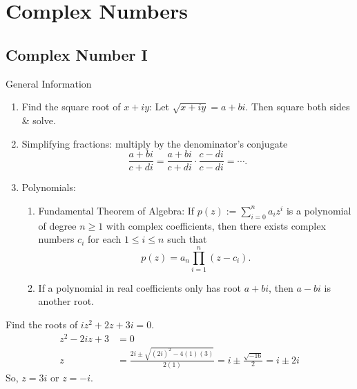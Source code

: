 \documentclass[oneside]{book}
\begin{document}
  \chapter{Complex Numbers}
  \section{Complex Number I}
  \begin{stbox}{General Information}
    \begin{enumerate}
      \item Find the square root of \(x+iy\): Let \(\sqrt{x+iy}=a+bi\). Then square both sides \& solve.
      \item Simplifying fractions: multiply by the denominator's conjugate
      \[\frac{a+bi}{c+di}=\frac{a+bi}{c+di}\cdot\frac{c-di}{c-di}=\cdots.\]
      \item Polynomials:
      \begin{enumerate}
        \item Fundamental Theorem of Algebra: If \(p(z):=\sum_{i=0}^{n}a_iz^i\) is a polynomial of degree \(n \geq 1\) with complex coefficients, then there exists complex numbers \(c_i\) for each \(1 \leq i \leq n\) such that 
        \[p(z)=a_n \prod_{i=1}^{n}(z-c_i).\]
        \item If a polynomial in real coefficients only has root \(a+bi\), then \(a-bi\) is another root.
      \end{enumerate}
    \end{enumerate}
    \end{stbox}
        \begin{example}{}{}
          Find the roots of \(iz^2+2z+3i=0\).
          \begin{align*}
            z^2-2iz+3&=0\\
            z&=\frac{2i \pm \sqrt{(2i)^2-4(1)(3)}}{2(1)}=i \pm \frac{\sqrt{-16}}{2}=i \pm 2i
          \end{align*}
          So, \(z=3i\) or \(z=-i\).
        \end{example}
\end{document}
